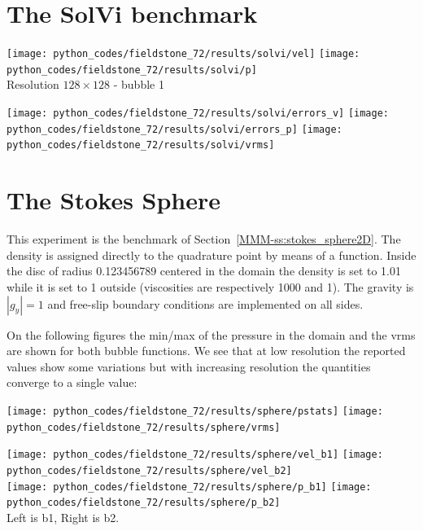 \section*{The SolVi benchmark}


\begin{center}
\texttt{[image: python\_codes/fieldstone\_72/results/solvi/vel]}
\texttt{[image: python\_codes/fieldstone\_72/results/solvi/p]}\\
{\captionfont Resolution $128\times128$ - bubble 1 }
\end{center}


\begin{center}
\texttt{[image: python\_codes/fieldstone\_72/results/solvi/errors\_v]}
\texttt{[image: python\_codes/fieldstone\_72/results/solvi/errors\_p]}
\texttt{[image: python\_codes/fieldstone\_72/results/solvi/vrms]}
\end{center}



\section*{The Stokes Sphere}

This experiment is the benchmark of Section~\ref{MMM-ss:stokes_sphere2D}. 
The density is assigned directly to the 
quadrature point by means of a function. Inside the disc of radius 0.123456789 centered in the domain 
the density is set to 1.01 while it is set to 1 outside 
(viscosities are respectively 1000 and 1). The gravity is $|g_y|=1$ and 
free-slip boundary conditions are implemented on all sides. 

On the following figures the min/max of the pressure in the domain and the vrms 
are shown for both bubble functions. We see that at low resolution the reported 
values show some variations but with increasing resolution the quantities converge to a single value:

\begin{center}
\texttt{[image: python\_codes/fieldstone\_72/results/sphere/pstats]}
\texttt{[image: python\_codes/fieldstone\_72/results/sphere/vrms]}
\end{center}

\begin{center}
\texttt{[image: python\_codes/fieldstone\_72/results/sphere/vel\_b1]}
\texttt{[image: python\_codes/fieldstone\_72/results/sphere/vel\_b2]}\\
\texttt{[image: python\_codes/fieldstone\_72/results/sphere/p\_b1]}
\texttt{[image: python\_codes/fieldstone\_72/results/sphere/p\_b2]}\\
{\captionfont Left is b1, Right is b2.}
\end{center}

